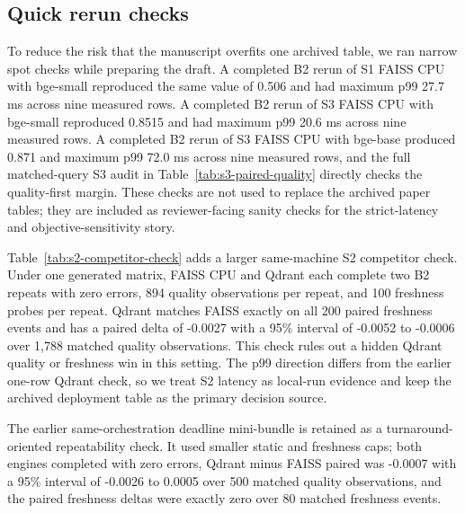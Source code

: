 \subsection{Quick rerun checks}

To reduce the risk that the manuscript overfits one archived table, we ran narrow spot checks while preparing the draft. A completed B2 rerun of S1 FAISS CPU with bge-small reproduced the same \ndcg{} value of 0.506 and had maximum p99 27.7 ms across nine measured rows. A completed B2 rerun of S3 FAISS CPU with bge-small reproduced \ecov{} 0.8515 and had maximum p99 20.6 ms across nine measured rows. A completed B2 rerun of S3 FAISS CPU with bge-base produced \ecov{} 0.871 and maximum p99 72.0 ms across nine measured rows, and the full matched-query S3 audit in Table~\ref{tab:s3-paired-quality} directly checks the quality-first margin. These checks are not used to replace the archived paper tables; they are included as reviewer-facing sanity checks for the strict-latency and objective-sensitivity story.



Table~\ref{tab:s2-competitor-check} adds a larger same-machine S2 competitor check. Under one generated matrix, FAISS CPU and Qdrant each complete two B2 repeats with zero errors, 894 quality observations per repeat, and 100 freshness probes per repeat. Qdrant matches FAISS exactly on all 200 paired freshness events and has a paired \ndcg{} delta of -0.0027 with a 95\% interval of -0.0052 to -0.0006 over 1{,}788 matched quality observations. This check rules out a hidden Qdrant quality or freshness win in this setting. The p99 direction differs from the earlier one-row Qdrant check, so we treat S2 latency as local-run evidence and keep the archived deployment table as the primary decision source.

The earlier same-orchestration deadline mini-bundle is retained as a turnaround-oriented repeatability check. It used smaller static and freshness caps; both engines completed with zero errors, Qdrant minus FAISS paired \ndcg{} was -0.0007 with a 95\% interval of -0.0026 to 0.0005 over 500 matched quality observations, and the paired freshness deltas were exactly zero over 80 matched freshness events.
